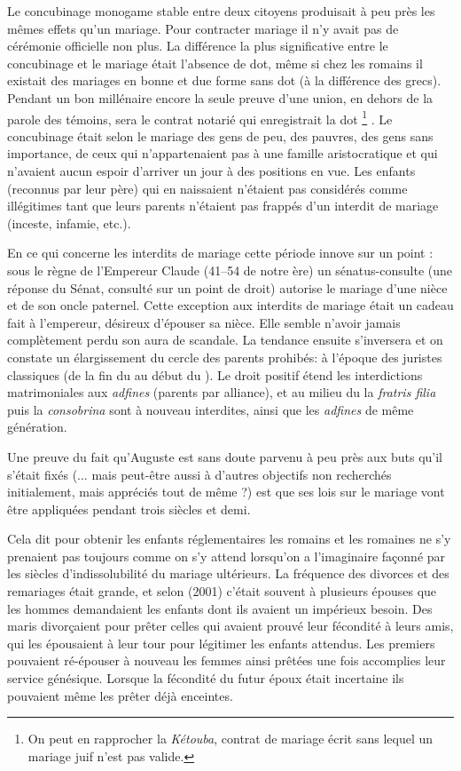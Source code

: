  Le concubinage monogame stable entre deux citoyens produisait à peu près les mêmes effets qu'un mariage. Pour contracter mariage il n'y avait pas de cérémonie officielle non plus. La différence la plus significative entre le concubinage et le mariage était l'absence de dot, même si chez les romains il existait des mariages en bonne et due forme sans dot (à la différence des grecs). Pendant un bon millénaire encore la seule preuve d'une union, en dehors de la parole des témoins, sera le contrat notarié qui enregistrait la dot%
\footnote{On peut en rapprocher la \emph{Kétouba}, contrat de mariage écrit sans lequel un mariage juif n'est pas valide.}%
. Le concubinage était selon  le mariage des gens de peu, des pauvres, des gens sans importance, de ceux qui n'appartenaient pas à une famille aristocratique et qui n'avaient aucun espoir d'arriver un jour à des positions en vue. Les enfants (reconnus par leur père) qui en naissaient n'étaient pas considérés comme illégitimes tant que leurs parents n'étaient pas frappés d'un interdit de mariage (inceste, infamie, etc.). 

 En ce qui concerne les interdits de mariage cette période innove sur un point : sous le règne de l'Empereur Claude (41--54 de notre ère) un sénatus-consulte (une réponse du Sénat, consulté sur un point de droit) autorise le mariage d'une nièce et de son oncle paternel. Cette exception aux interdits de mariage était un cadeau fait à l'empereur, désireux d'épouser sa nièce. Elle semble n'avoir jamais complètement perdu son aura de scandale. La tendance ensuite s'inversera et on constate un élargissement du cercle des parents prohibés: à l'époque des juristes classiques (de la fin du  au début du ). Le droit positif étend les interdictions matrimoniales aux \emph{adfines} (parents par alliance), et au milieu du  la \emph{fratris filia} puis la \emph{consobrina} sont à nouveau interdites, ainsi que les \emph{adfines} de même génération.

 Une preuve du fait qu'Auguste est sans doute parvenu à peu près aux buts qu'il s'était fixés (... mais peut-être aussi à d'autres objectifs non recherchés initialement, mais appréciés tout de même ?) est que ses lois sur le mariage vont être appliquées pendant trois siècles et demi. 

 Cela dit pour obtenir les enfants réglementaires les romains et les romaines ne s'y prenaient pas toujours comme on s'y attend lorsqu'on a l'imaginaire façonné par les siècles d'indissolubilité du mariage ultérieurs. La fréquence des divorces et des remariages était grande, et selon  (2001) c'était souvent à plusieurs épouses que les hommes demandaient les enfants dont ils avaient un impérieux besoin. Des maris divorçaient pour prêter celles qui avaient prouvé leur fécondité à leurs amis, qui les épousaient à leur tour pour légitimer les enfants attendus. Les premiers pouvaient ré-épouser à nouveau les femmes ainsi prêtées une fois accomplies leur service génésique. Lorsque la fécondité du futur époux était incertaine ils pouvaient même les prêter déjà enceintes. 

